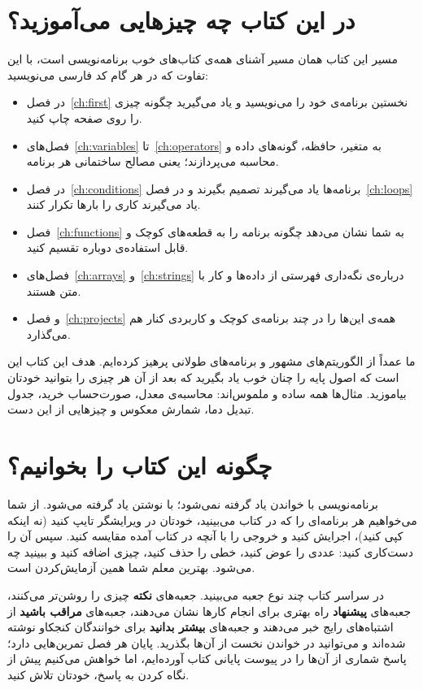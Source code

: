 \section*{در این کتاب چه چیزهایی می‌آموزید؟}

مسیر این کتاب همان مسیر آشنای همه‌ی کتاب‌های خوب برنامه‌نویسی است، با این
تفاوت که در هر گام کد فارسی می‌نویسید:
\begin{itemize}
  \item در فصل~\ref{ch:first} نخستین برنامه‌ی خود را می‌نویسید و یاد
        می‌گیرید چگونه چیزی را روی صفحه چاپ کنید.
  \item فصل‌های~\ref{ch:variables} تا~\ref{ch:operators} به متغیر، حافظه،
        گونه‌های داده و محاسبه می‌پردازند؛ یعنی مصالح ساختمانی هر برنامه.
  \item در فصل~\ref{ch:conditions} برنامه‌ها یاد می‌گیرند تصمیم بگیرند و
        در فصل~\ref{ch:loops} یاد می‌گیرند کاری را بارها تکرار کنند.
  \item فصل~\ref{ch:functions} به شما نشان می‌دهد چگونه برنامه را به
        قطعه‌های کوچک و قابل استفاده‌ی دوباره تقسیم کنید.
  \item فصل‌های~\ref{ch:arrays} و~\ref{ch:strings} درباره‌ی نگه‌داری
        فهرستی از داده‌ها و کار با متن هستند.
  \item و فصل~\ref{ch:projects} همه‌ی این‌ها را در چند برنامه‌ی کوچک و
        کاربردی کنار هم می‌گذارد.
\end{itemize}
ما عمداً از الگوریتم‌های مشهور و برنامه‌های طولانی پرهیز کرده‌ایم. هدف این
کتاب این است که اصول پایه را چنان خوب یاد بگیرید که بعد از آن هر چیزی را
بتوانید خودتان بیاموزید. مثال‌ها همه ساده و ملموس‌اند: محاسبه‌ی معدل، صورت‌حساب
خرید، جدول تبدیل دما، شمارش معکوس و چیزهایی از این دست.

\section*{چگونه این کتاب را بخوانیم؟}

برنامه‌نویسی با خواندن یاد گرفته نمی‌شود؛ با نوشتن یاد گرفته می‌شود. از شما
می‌خواهیم هر برنامه‌ای را که در کتاب می‌بینید، خودتان در ویرایشگر تایپ کنید
(نه اینکه کپی کنید)، اجرایش کنید و خروجی را با آنچه در کتاب آمده مقایسه
کنید. سپس آن را دست‌کاری کنید: عددی را عوض کنید، خطی را حذف کنید، چیزی
اضافه کنید و ببینید چه می‌شود. بهترین معلم شما همین آزمایش‌کردن است.

در سراسر کتاب چند نوع جعبه می‌بینید. جعبه‌های \textbf{نکته} چیزی را روشن‌تر
می‌کنند، جعبه‌های \textbf{پیشنهاد} راه بهتری برای انجام کارها نشان می‌دهند،
جعبه‌های \textbf{مراقب باشید} از اشتباه‌های رایج خبر می‌دهند و جعبه‌های
\textbf{بیشتر بدانید} برای خوانندگان کنجکاو نوشته شده‌اند و می‌توانید در
خواندن نخست از آن‌ها بگذرید. پایان هر فصل تمرین‌هایی دارد؛ پاسخ شماری از
آن‌ها را در پیوست پایانی کتاب آورده‌ایم، اما خواهش می‌کنیم پیش از نگاه
کردن به پاسخ، خودتان تلاش کنید.

